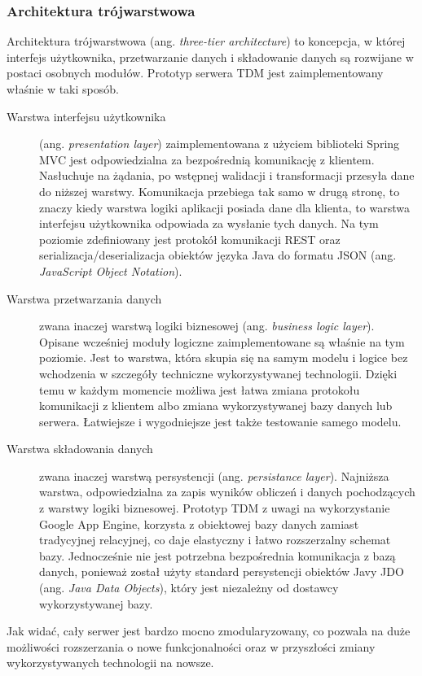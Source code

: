 \subsubsection{Architektura trójwarstwowa}
Architektura trójwarstwowa (ang. \textit{three-tier architecture}) to koncepcja,
w której interfejs użytkownika, przetwarzanie danych i składowanie danych są
rozwijane w postaci osobnych modułów. Prototyp serwera TDM jest zaimplementowany
właśnie w taki sposób.

\begin{description}
  \item[Warstwa interfejsu użytkownika] (ang. \textit{presentation
  layer}) zaimplementowana z użyciem biblioteki Spring MVC jest odpowiedzialna
  za bezpośrednią komunikację z klientem.
  Nasłuchuje na żądania, po wstępnej walidacji i transformacji przesyła dane do
  niższej warstwy. Komunikacja przebiega tak samo w drugą stronę, to znaczy
  kiedy warstwa logiki aplikacji posiada dane dla klienta, to warstwa interfejsu
  użytkownika odpowiada za wysłanie tych danych. Na tym poziomie zdefiniowany
  jest protokół komunikacji REST oraz serializacja/deserializacja obiektów
  języka Java do formatu JSON (ang. \textit{JavaScript Object Notation}).
  
  \item[Warstwa przetwarzania danych] zwana inaczej warstwą logiki biznesowej
  (ang. \textit{business logic layer}). Opisane wcześniej moduły logiczne
  zaimplementowane są właśnie na tym poziomie. Jest to warstwa, która skupia się
  na samym modelu i logice bez wchodzenia w szczegóły techniczne wykorzystywanej
  technologii. Dzięki temu w każdym momencie możliwa jest łatwa zmiana protokołu
  komunikacji z klientem albo zmiana wykorzystywanej bazy danych lub serwera.
  Łatwiejsze i wygodniejsze jest także testowanie samego modelu.
  
  \item[Warstwa składowania danych] zwana inaczej warstwą persystencji (ang.
  \textit{persistance layer}). Najniższa warstwa, odpowiedzialna za zapis
  wyników obliczeń i danych pochodzących z warstwy logiki biznesowej. Prototyp
  TDM z uwagi na wykorzystanie Google App Engine, korzysta z obiektowej bazy
  danych zamiast tradycyjnej relacyjnej, co daje elastyczny i łatwo rozszerzalny
  schemat bazy. Jednocześnie nie jest potrzebna bezpośrednia komunikacja z bazą
  danych, ponieważ został użyty standard persystencji obiektów Javy JDO (ang.
  \textit{Java Data Objects}), który jest niezależny od dostawcy wykorzystywanej
  bazy.
\end{description}
Jak widać, cały serwer jest bardzo mocno zmodularyzowany, co pozwala na duże
możliwości rozszerzania o nowe funkcjonalności oraz w przyszłości zmiany
wykorzystywanych technologii na nowsze.

